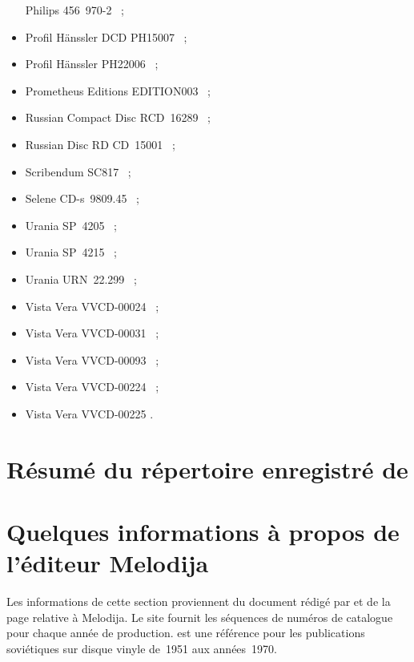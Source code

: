 \begin{itemize}
 Philips 456~\hbox{970-2} \citep{Johnson, Moreau, Szersnovicz99,
 VincentLancrin, Young99}~;
 \item
 Profil Hänssler DCD PH15007 \citep{Beyne, Bigorie, Boissard15, Church,
 Greenbank, Harrington15b, Hulot}~;
 \item
 Profil Hänssler PH22006 \citep{Lacroix}~;
 \item
 Prometheus Editions EDITION003 \citep{Fanning03, Morrison02, Potter,
 Sturrock}~;
 \item
 Russian Compact Disc RCD~16289 \citep{Masters19}~;
 \item
 Russian Disc RD CD~15001 \citep{Evans93, Hoffele}~;
 \item
 Scribendum SC817 \citep{Chizynski, Distler20, Hoffele20}~;
 \item
 Selene \hbox{CD-s}~9809.45 \citep{Rabinowitz99}~;
 \item
 Urania SP~4205 \citep{Danzin, Lompech03}~;
 \item
 Urania SP~4215 \citep{Bolen}~;
 \item
 Urania URN~22.299 \citep{DiazGomez}~;
 \item
 Vista Vera VVCD-00024 \citep{Marcinik, Woolf04a}~;
 \item
 Vista Vera VVCD-00031 \citep{Woolf04b}~;
 \item
 Vista Vera VVCD-00093 \citep{Harrington07, Lewis}~;
 \item
 Vista Vera VVCD-00224 \citep{Woolf11a}~;
 \item
 Vista Vera VVCD-00225 \citep{Woolf11b}.
\end{itemize}

\section[%
Résumé du répertoire enregistré de Vladimir Sofronickij]{%
Résumé du répertoire enregistré de \VSofronitsky{}}


\section{Quelques informations à propos de l'éditeur Melodija}

Les informations de cette section proviennent du document rédigé par
\citet{Crocker} et de la page \citet{WikipediaMelodiya} relative à Melodija.
Le site \citet{Rockdisco} fournit les séquences de numéros de catalogue pour
chaque année de production.
\citet{Bennett} est une référence pour les publications soviétiques sur
disque vinyle de~1951 aux années~1970.

